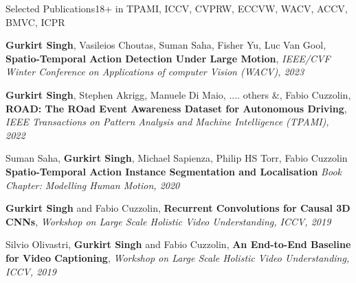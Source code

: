 \documentclass{resume_long} %
\begin{document}
\vspace{0.1in}
\begin{rSection}{Selected Publications}{18+\footnotesize{ in TPAMI, ICCV, CVPRW, ECCVW, WACV, ACCV, BMVC, ICPR}}

\small{\textbf{Gurkirt Singh}, Vasileios Choutas, Suman Saha, Fisher Yu, Luc Van Gool},
\textbf{Spatio-Temporal Action Detection Under Large Motion},
\textit{\small{IEEE/CVF Winter Conference on Applications of computer Vision (WACV), 2023}}

\small{\textbf{Gurkirt Singh}, Stephen Akrigg, Manuele Di Maio, .... others \&,
Fabio Cuzzolin},
\textbf{ROAD: The ROad Event Awareness Dataset for Autonomous Driving},
\textit{\small{IEEE Transactions on Pattern Analysis and Machine Intelligence (TPAMI), 2022}}



\vspace{-0.03in}
\small{Suman Saha, \textbf{Gurkirt Singh}, Michael Sapienza, Philip HS Torr, Fabio Cuzzolin}
\textbf{Spatio-Temporal Action Instance Segmentation and Localisation}
\textit{\small{Book Chapter: Modelling Human Motion, 2020}}

\vspace{-0.03in}
\small{\textbf{Gurkirt Singh} and Fabio Cuzzolin},
\textbf{Recurrent Convolutions for Causal 3D CNNs},
\textit{\small{Workshop on Large Scale Holistic Video Understanding, ICCV, 2019}}

\vspace{-0.03in}
\small{Silvio Olivastri, \textbf{Gurkirt Singh} and Fabio Cuzzolin},
\textbf{An End-to-End Baseline for Video Captioning},
\textit{\small{Workshop on Large Scale Holistic Video Understanding, ICCV, 2019}}


\end{rSection}
\end{document}
